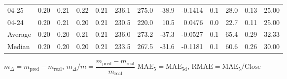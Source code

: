 \begin{threeparttable}
{\begin{tabular}{lrrrrrrrrrrrr}
  04-25 &          0.20 &          0.21 &          0.22 &        0.21 &               236.1 &               275.0 &      -38.9 &      -0.1414 &                 0.1 &             28.0 &            0.13 &                  25.00 \\
  04-24 &          0.20 &          0.21 &          0.20 &        0.21 &               230.5 &               220.0 &       10.5 &       0.0476 &                 0.0 &             22.7 &            0.11 &                  25.00 \\
Average &          0.20 &          0.20 &          0.21 &        0.21 &               236.0 &               273.2 &      -37.3 &      -0.0527 &                 0.1 &             65.4 &            0.29 &                  32.33 \\
 Median &          0.20 &          0.20 &          0.20 &        0.21 &               233.5 &               267.5 &      -31.6 &      -0.1181 &                 0.1 &             60.6 &            0.26 &                  30.00 \\
\bottomrule
\end{tabular}
}
\begin{tablenotes}\footnotesize
\item $m_\Delta=m_{\text{pred}}-m_{\text{real}}$,
$m_\Delta/m=\dfrac{m_{\text{pred}}-m_{\text{real}}}{m_{\text{real}}}$
$\mathrm{MAE}_5=\mathrm{MAE}_{5\text{d}}$,
$\mathrm{RMAE}=\mathrm{MAE}_5/\text{Close}$
\end{tablenotes}
\end{threeparttable}
\endgroup

